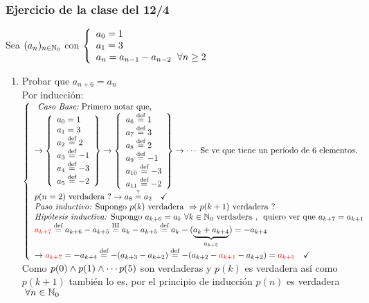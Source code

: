 \subsubsection*{Ejercicio de la clase del 12/4}
Sea $(a_n)_{n \en \naturales_0}$ con
$\llave{l}{
		a_0 = 1\\
		a_1 = 3\\
		a_n = a_{n-1} - a_{n-2}\ \paratodo n \geq 2
	}$
\begin{enumerate}[label=(\alph*)]
	\item Probar que $a_{n+6} = a_n$\\
	      Por inducción: \\
	      $\llave{l}{
		      \textit{ Caso Base:} \text{ Primero notar que,} \\
		      \to
		      \llaves{l}{
			      a_0 = 1\\
			      a_1 = 3\\
			      a_2 \eqDef= 2\\
			      a_3 \eqDef= -1\\
			      a_4 \eqDef= -3\\
			      a_5 \eqDef= -2
		      } \to
		      \llaves{l}{
			      a_6 \eqDef= 1\\
			      a_7 \eqDef= 3\\
			      a_8 \eqDef= 2\\
			      a_9 \eqDef= -1\\
			      a_{10} \eqDef= -3\\
			      a_{11} \eqDef= -2
		      } \to
		      \cdots \text{ Se ve que tiene un período de 6 elementos.}\\

		      p(n=2) \V? \to a_8 \eq?= a_2 \Tilde\\

		      \textit{Paso inductivo: } \text{Supongo } p(k) \V \entonces p(k+1) \V?\\
		      \textit{Hipótesis inductiva: }
		      \text{Supongo } a_{k+6} = a_k \paratodo k \in \naturales_0 \V ,\, \qvq a_{k+7} = a_{k+1}\\
		      \red{a_{k+7}} \eqDef=
		      a_{k+6} - a_{k+5} \stacktext{HI}{=}
		      a_k - a_{k+5} \eqDef=
		      a_k - (\ub{ a_k + a_{k+4}}{a_{k+5}}) = -a_{k+4}\\
		      \to \red{a_{k+7}} = -a_{k+4} \eqDef=
		      -(a_{k+3} - a_{k+2}) \eqDef =
		      - ( a_{k+2} - \red{a_{k+1}} - a_{k+2} ) = \red{a_{k+1}} \Tilde
		      }\\
	      $\\
	      Como $p(0) \y p(1) \y \cdots p(5)$ son verdaderas y $p(k)$ es verdadera así como $p(k+1)$ también lo es, por el principio de inducción $p(n)$ es verdadera $\paratodo n \in \naturales_0$


\end{enumerate}
